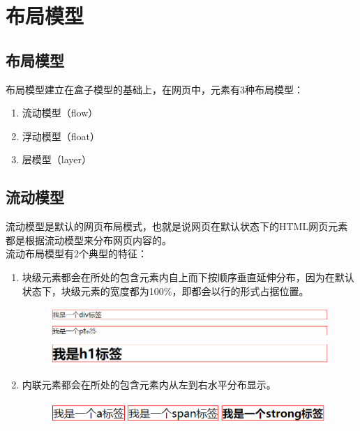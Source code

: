 \newpage

\section{布局模型}

\subsection{布局模型}

布局模型建立在盒子模型的基础上，在网页中，元素有3种布局模型：

\begin{enumerate}
	\item 流动模型（flow）
	\item 浮动模型（float）
	\item 层模型（layer）
\end{enumerate}

\vspace{0.5cm}

\subsection{流动模型}

流动模型是默认的网页布局模式，也就是说网页在默认状态下的HTML网页元素都是根据流动模型来分布网页内容的。\\

流动布局模型有2个典型的特征：

\begin{enumerate}
	\item 块级元素都会在所处的包含元素内自上而下按顺序垂直延伸分布，因为在默认状态下，块级元素的宽度都为100\%，即都会以行的形式占据位置。
	      \begin{figure}[H]
		      \centering
		      \includegraphics[scale=0.7]{img/C8/8-3/1.png}
	      \end{figure}

	\item 内联元素都会在所处的包含元素内从左到右水平分布显示。
	      \begin{figure}[H]
		      \centering
		      \includegraphics[]{img/C8/8-3/2.png}
	      \end{figure}
\end{enumerate}

